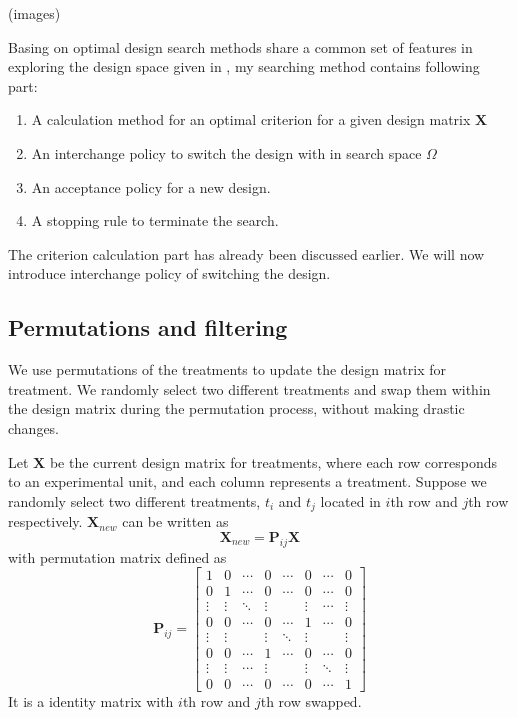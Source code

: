 \documentclass[
  a4paper,
  oneside,
  openany,
  12pt,
  onecolumn]{book}
\theoremstyle{plain}
\theoremstyle{definition}
\theoremstyle{remark}
\begin{document}
(images)

Basing on optimal design search methods share a common set of features
in exploring the design space given in \citet{butler2013optimal}, my
searching method contains following part:

\begin{enumerate}
\def\labelenumi{\arabic{enumi}.}
\item
  A calculation method for an optimal criterion for a given design
  matrix \(\boldsymbol{X}\)
\item
  An interchange policy to switch the design with in search space
  \(\Omega\)
\item
  An acceptance policy for a new design.
\item
  A stopping rule to terminate the search.
\end{enumerate}

The criterion calculation part has already been discussed earlier. We
will now introduce interchange policy of switching the design.

\subsection{Permutations and
filtering}\label{permutations-and-filtering}

We use permutations of the treatments to update the design matrix for
treatment. We randomly select two different treatments and swap them
within the design matrix during the permutation process, without making
drastic changes.

Let \(\boldsymbol{X}\) be the current design matrix for treatments,
where each row corresponds to an experimental unit, and each column
represents a treatment. Suppose we randomly select two different
treatments, \(t_i\) and \(t_j\) located in \(i\)th row and \(j\)th row
respectively. \(\boldsymbol{X}_{new}\) can be written as \[
\boldsymbol{X}_{new} = \boldsymbol{P}_{ij}\boldsymbol{X}
\] with permutation matrix defined as \[
 \boldsymbol{P}_{i j}=\left[
 \begin{array}{cccccccc}
 1 & 0 & \cdots & 0 & \cdots & 0 & \cdots & 0 \\ 
 0 & 1 & \cdots & 0 & \cdots &0 & \cdots & 0 \\ 
 \vdots & \vdots & \ddots & \vdots & & \vdots & \cdots & \vdots \\ 
 0 & 0 & \cdots & 0 & \cdots & 1 & \cdots & 0 \\
 \vdots & \vdots & & \vdots & \ddots & \vdots & & \vdots\\
 0 & 0 & \cdots & 1 & \cdots & 0 & \cdots & 0 \\ 
 \vdots & \vdots & \cdots & \vdots & & \vdots & \ddots & \vdots \\ 
 0 & 0 & \cdots & 0 & \cdots & 0 & \cdots & 1
 \end{array}\right] 
\] It is a identity matrix with \(i\)th row and \(j\)th row swapped.
\end{document}
